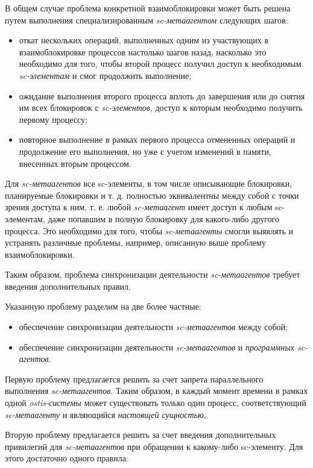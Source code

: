 В общем случае проблема конкретной взаимоблокировки может быть решена путем выполнения специализированным \textit{sc-метаагентом} следующих шагов:	
\begin{itemize}
	\item откат нескольких операций, выполненных одним из участвующих в взаимоблокировке процессов настолько шагов назад, насколько это необходимо для того, чтобы второй процесс получил доступ к необходимым \textit{sc-элементам} и смог продолжить выполнение;
	\item ожидание выполнения второго процесса вплоть до завершения или до снятия им всех блокировок с \textit{sc-элементов}, доступ к которым необходимо получить первому процессу;
	\item повторное выполнение в рамках первого процесса отмененных операций и продолжение его выполнения, но уже с учетом изменений в памяти, внесенных вторым процессом.		
\end{itemize}

Для \textit{sc-метаагентов} все sc-элементы, в том числе описывающие блокировки, планируемые блокировки и т. д. полностью эквивалентны между собой с точки зрения доступа к ним, т. е. любой \textit{sc-метаагент} имеет доступ к любым sc-элементам, даже попавшим в полную блокировку для какого-либо другого процесса. Это необходимо для того, чтобы \textit{sc-метаагенты} смогли выявлять и устранять различные проблемы, например, описанную выше проблему взаимоблокировки.

Таким образом, проблема синхронизации деятельности \textit{sc-метаагентов} требует введения дополнительных правил.

Указанную проблему разделим на две более частные:
\begin{itemize}
	\item обеспечение синхронизации деятельности \textit{sc-метаагентов} между собой;
	\item обеспечение синхронизации деятельности \textit{sc-метаагентов} и \textit{программных sc-агентов}.		
\end{itemize}

Первую проблему предлагается решить за счет запрета параллельного выполнения \textit{sc-метаагентов}. Таким образом, в каждый момент времени в рамках одной \textit{ostis-системы} может существовать только один процесс, соответствующий \textit{sc-метаагенту} и являющийся \textit{настоящей сущностью}. 

Вторую проблему предлагается решить за счет введения дополнительных привилегий для \textit{sc-метаагентов} при обращении к какому-либо sc-элементу. Для этого достаточно одного правила: 

